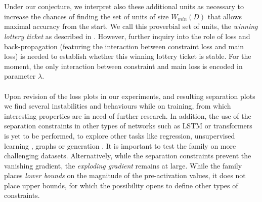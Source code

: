 \\\\
Under our conjecture, we interpret also these additional units as necessary to increase the chances of finding the set of units of size $W_{min}(D)$ that allows maximal accuracy from the start. We call this proverbial set of units, the \emph{winning lottery ticket} as described in \cite{lottery}. However, further inquiry into the role of loss and back-propagation (featuring the interaction between constraint loss and main loss) is needed to establish whether this winning lottery ticket is stable. For the moment, the only interaction between constraint and main loss is encoded in parameter $\lambda$. 
\\\\
Upon revision of the loss plots in our experiments, and resulting separation plots we find several instabilities and behaviours while on training, from which interesting properties are in need of further research. In addition,  the use of the separation constraints in other types of networks such as LSTM \cite{lstm} or transformers \cite{transformer}\cite{transformer2} is yet to be performed, to explore other tasks like regression, unsupervised learning \cite{embedding}, graphs \cite{graph} or generation \cite{gan,vae}. It is important to test the \SepConstraint family on more challenging datasets.  Alternatively, while the separation constraints prevent the vanishing gradient, the \emph{exploding gradient} remains at large. While the \SepConstraint family places \emph{lower bounds} on the magnitude of the pre-activation values, it does not place upper bounds, for which the possibility opens to define other types of constraints. 





